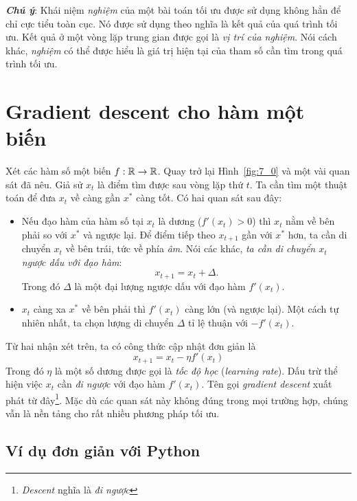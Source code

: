 \textit{\textbf{Chú ý}}: Khái niệm \textit{nghiệm} của một bài toán tối ưu được sử dụng không hẳn để chỉ cực tiểu toàn cục. Nó được sử dụng theo nghĩa là kết quả của quá trình tối ưu. Kết quả ở một vòng lặp trung gian được gọi là \textit{vị trí của nghiệm}. Nói cách khác, \textit{nghiệm} có thể được hiểu là giá trị hiện tại của tham số cần tìm trong quá trình tối ưu.



\section{Gradient descent cho hàm một biến}
Xét các hàm số một biến $f: \mathbb{R} \rightarrow \mathbb{R}$. Quay trở lại Hình~\ref{fig:7_0}
và một vài quan sát đã nêu. Giả sử  $x_{t}$ là điểm tìm được sau vòng lặp thứ
$t$. Ta cần tìm một thuật toán để đưa $x_{t}$ về càng gần $x^*$ càng tốt. Có hai
quan sát sau đây:
\begin{itemize}
\item Nếu đạo hàm của hàm số tại $x_{t}$ là dương ($f'(x_{t}) > 0$) thì
$x_t$ nằm
về bên phải so với $x^*$ và ngược lại. Để điểm tiếp theo $x_{t+1}$ gần với
$x^*$ hơn, ta cần di chuyển $x_t$ về bên trái, tức về phía
\textit{âm}. Nói các khác, \textit{ta cần di chuyển $x_t$ ngược dấu với đạo hàm}:
\begin{equation}
x_{t+1} = x_t + \Delta.
\end{equation}
Trong đó $\Delta$ là một đại lượng ngược dấu với đạo hàm $f'(x_t)$.

\item $x_t$ càng xa $x^*$ về bên phải thì $f'(x_t)$ càng lớn (và
ngược lại). Một cách tự nhiên nhất, ta chọn lượng di chuyển $\Delta$ tỉ lệ
thuận với $-f'(x_t)$.
\end{itemize}
Từ hai nhận xét trên, ta có công thức cập nhật đơn giản là
\begin{equation}
\boxed{
x_{t+1} = x_t - \eta f'(x_t)
}
\end{equation}
Trong đó $\eta$ là một số dương được gọi là \textit{tốc độ học}
(\textit{learning rate}). Dấu trừ thể hiện việc $x_t$ cần \textit{đi ngược} với
đạo hàm $f'(x_t)$. Tên gọi \textit{gradient descent} xuất phát từ đây\footnote{
\textit{Descent} nghĩa là \textit{đi ngược}}. Mặc dù các quan sát này không đúng
trong mọi trường hợp, chúng vẫn là nền tảng cho rất nhiều phương pháp tối ưu.

\subsection{Ví dụ đơn giản với Python}

